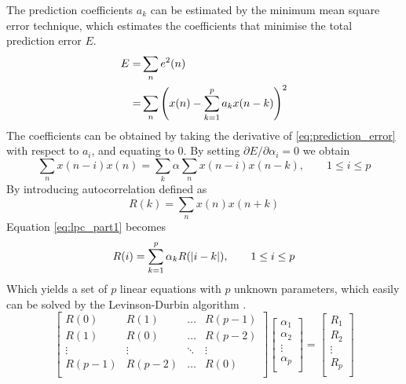 The prediction coefficients $a_k$ can be estimated by the minimum mean square error technique, which estimates the coefficients that minimise the total prediction error $E$.
\begin{equation}
	\label{eq:prediction_error}
	\begin{split}
		E = & \sum_{n} e^2(n)\\
		= & \sum_{n}\left(x(n)-\sum_{k=1}^{p}a_k x(n-k)\right)^2
	\end{split}
\end{equation}
The coefficients can be obtained by taking the derivative of \eqref{eq:prediction_error} with respect to $a_i$, and equating to 0. By setting $\partial E/\partial \alpha_i = 0$ we obtain
\begin{equation}
	\sum_{n}x(n-i)x(n) = \sum_{k}\alpha \sum_{n}x(n-i)x(n-k), \qquad  1\leq i\leq p 
	\label{eq:lpc_part1}
\end{equation}	
By introducing autocorrelation defined as
\begin{equation}
	R(k) = \sum_{n} x(n) x(n+k)
\end{equation}
Equation \eqref{eq:lpc_part1} becomes
\begin{equation}
	R(i) = \sum_{k=1}^{p} \alpha_k R(\lvert i-k\rvert), \qquad  1\leq i\leq p
	\label{eq:lpc_part2}
\end{equation}
Which yields a set of $p$ linear equations with $p$ unknown parameters, which easily can be solved by \eg the Levinson-Durbin algorithm \cite{digsig,cybenko80}.
\begin{equation}
	\begin{bmatrix}
		R(0) & R(1) & \dots & R(p-1) \\
		R(1) & R(0) & \dots & R(p-2) \\
		\vdots & \vdots & \ddots & \vdots \\
		R(p-1) & R(p-2) & \dots & R(0) \\
	\end{bmatrix} 
	\begin{bmatrix}
		\alpha_1 \\
		\alpha_2 \\
		\vdots \\
		\alpha_p \\
	\end{bmatrix}
	=
	\begin{bmatrix}
		R_1 \\
		R_2 \\
		\vdots \\
		R_p \\
	\end{bmatrix}
	\label{eq:yule_walker}
\end{equation}

